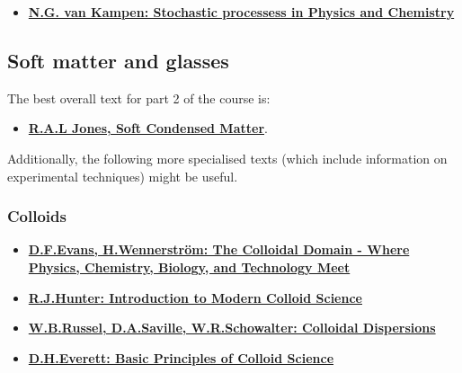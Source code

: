 \documentclass[
  letterpaper,
  DIV=11,
  numbers=noendperiod]{scrreprt}
\providecommand{\tightlist}{%
  \setlength{\itemsep}{0pt}\setlength{\parskip}{0pt}}\usepackage{longtable,booktabs,array}
\begin{document}
\begin{itemize}
\tightlist
\item
  \textbf{\href{https://bris.on.worldcat.org/search/detail/162131511?queryString=Stochastic\%20Processes\%20in\%20Physics\%20and\%20Chemistry\%20by\%20N.G.\%20van\%20Kampen&clusterResults=true&stickyFacetsChecked=true&groupVariantRecords=false}{N.G.
  van Kampen: Stochastic processess in Physics and Chemistry}}
\end{itemize}

\subsection*{Soft matter and glasses}\label{soft-matter-and-glasses}

The best overall text for part 2 of the course is:

\begin{itemize}
\tightlist
\item
  \textbf{\href{https://bris.on.worldcat.org/search/detail/48753186?queryString=soft\%20condensed\%20matter&clusterResults=true&stickyFacetsChecked=true&groupVariantRecords=false}{R.A.L
  Jones, Soft Condensed Matter}}.
\end{itemize}

Additionally, the following more specialised texts (which include
information on experimental techniques) might be useful.

\subsubsection*{Colloids}\label{colloids}

\begin{itemize}
\tightlist
\item
  \textbf{\href{https://bris.on.worldcat.org/search/detail/39129921?queryString=The\%20Colloidal\%20Domain&clusterResults=true&stickyFacetsChecked=true&groupVariantRecords=false&newsArticles=off&bookReviews=off}{D.F.Evans,
  H.Wennerström: The Colloidal Domain - Where Physics, Chemistry,
  Biology, and Technology Meet}}
\item
  \textbf{\href{https://bris.on.worldcat.org/search/detail/27810428?queryString=Introduction\%20to\%20Modern\%20Colloid\%20Science&clusterResults=true&stickyFacetsChecked=true&groupVariantRecords=false&newsArticles=off&bookReviews=off}{R.J.Hunter:
  Introduction to Modern Colloid Science}}
\item
  \textbf{\href{https://bris.on.worldcat.org/search/detail/18869758?queryString=colloidal\%20dispersions&clusterResults=true&stickyFacetsChecked=true&groupVariantRecords=false&newsArticles=off&bookReviews=off}{W.B.Russel,
  D.A.Saville, W.R.Schowalter: Colloidal Dispersions}}
\item
  \textbf{\href{https://bris.on.worldcat.org/search/detail/232632488?queryString=Basic\%20Principles\%20of\%20Colloid\%20Science&clusterResults=true&stickyFacetsChecked=true&groupVariantRecords=false&newsArticles=off&bookReviews=off}{D.H.Everett:
  Basic Principles of Colloid Science}}
\end{itemize}
\end{document}
